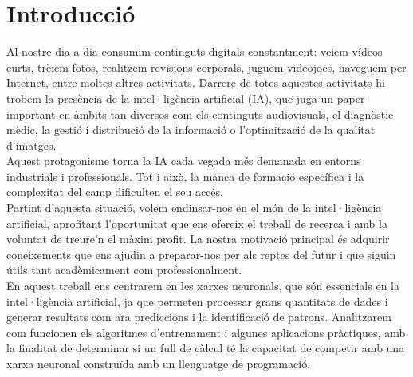 \chapter{Introducció}
\label{c:intro}
Al nostre dia a dia consumim continguts digitals constantment: veiem vídeos curts, trèiem fotos, realitzem revisions corporals, juguem videojocs, naveguem per Internet, entre moltes altres activitats. Darrere de totes aquestes activitats hi trobem la presència de la intel·ligència artificial (IA), que juga un paper important en àmbits tan diversos com els continguts audiovisuals, el diagnòstic mèdic, la gestió i distribució de la informació o l’optimització de la qualitat d’imatges.\\

Aquest protagonisme torna la IA cada vegada més demanada en entorns industrials i professionals. Tot i això, la manca de formació específica i la complexitat del camp dificulten el seu accés.\\

Partint d’aquesta situació, volem endinsar-nos en el món de la intel·ligència artificial, aprofitant l’oportunitat que ens ofereix el treball de recerca i amb la voluntat de treure’n el màxim profit. La nostra motivació principal és adquirir coneixements que ens ajudin a preparar-nos per als reptes del futur i que siguin útils tant acadèmicament com professionalment.\\

En aquest treball ens centrarem en les xarxes neuronals, que són essencials en la intel·ligència artificial, ja que permeten processar grans quantitats de dades i generar resultats com ara prediccions i la identificació de patrons. Analitzarem com funcionen els algoritmes d’entrenament i algunes aplicacions pràctiques, amb la finalitat de determinar si un full de càlcul té la capacitat de competir amb una xarxa neuronal construïda amb un llenguatge de programació.

\clearpage
